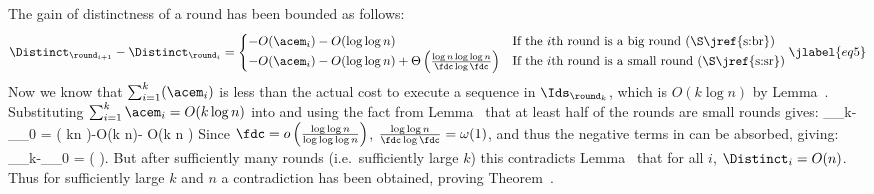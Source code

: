 The gain of distinctness of a round has been bounded as follows:
\begin{equation}
 \Distinct_{\round_{i+1}}-\Distinct_{\round_i} =
 \begin{cases}
-O(\acem_i)-O(\log \log n)  & \text{If the $i$th round is a big round (\S\jref{s:br})}\\
-O(\acem_i)-O(\log \log n) + \Theta \left( \frac{\log n \log \log n}{\fdc \log \fdc} \right)
&\text{If the $i$th round is a small round (\S\jref{s:sr})}
\end{cases}\jlabel{eq5}
\end{equation}
Now we know that $\sum_{i=1}^k (\acem_i)$ is less than the actual cost to execute a sequence in $\Ids_{\round_k}$, which is $O(k {} \log n )$ by Lemma~. Substituting $\sum_{i=1}^k \acem_i = O(k {} \log n )$ into   and using the fact from Lemma~ that at least half of the rounds are small rounds gives:
\shortfull{$}{\begin{equation}}  \Distinct_{\round_k}-\Distinct_{\round_0} =  \Theta \left( k\log n  \right)-O(k \log \log n)- O(k  \log n )  
\shortfull{$}{\end{equation}}
Since $\fdc=o\left( \frac{\log \log n}{\log \log \log n} \right)$, 
$\frac{\log \log n}{\fdc \log \fdc} =\omega(1)$, and thus
the negative terms in can be absorbed, giving:
\shortfull{$}{$$} \Distinct_{\round_k}-\Distinct_{\round_0} = \Theta \left(  \right).
\shortfull{$}{$$}
But after sufficiently many rounds (i.e.~sufficiently large $k$) this contradicts Lemma~ that for all $i$, $\Distinct_i = O(n)$. Thus for sufficiently large $k$ and $n$ a contradiction has been obtained, proving Theorem~. 



